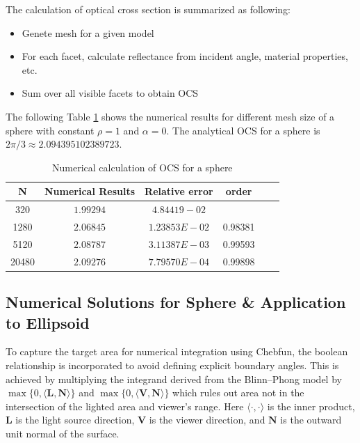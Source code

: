 \documentclass[11pt]{amsart}
\theoremstyle{definition}
\begin{document}
The calculation of optical cross section is summarized as following:
\begin{itemize}
\item Genete mesh for a given model
\item For each facet, calculate reflectance from incident angle, material properties, etc.
\item Sum over all visible facets to obtain OCS
\end{itemize} 
The following Table \ref{table: sphere OCS} shows the numerical results for different mesh size of a sphere with constant $\rho=1$ and $\alpha=0$. The analytical OCS for a sphere is $2\pi/3\approx 2.094395102389723$.
\begin{table}[H]
	\small
	\caption{Numerical calculation of OCS for a sphere
	}
	\centering
	\begin{tabular}{|c|c|c|c|c|c|}
	\hline
	N & Numerical Results & Relative error & order \\
	\hline
	320 & $1.99294$ & $4.84419-02$ &  \\
    \hline	
	1280 & $2.06845$ & $1.23853E-02$ & 0.98381 \\
    \hline	
	5120 & $2.08787$ & $3.11387E-03$ & 0.99593 \\
	\hline
	20480 & $2.09276$ & $7.79570E-04$ & 0.99898 \\
	\hline
	\end{tabular}
	\label{table: sphere OCS}
\end{table}
  
\subsection{Numerical Solutions for Sphere \& Application to Ellipsoid}

To capture the target area for numerical integration using Chebfun, the boolean relationship is incorporated to avoid defining explicit boundary angles. This is achieved by multiplying the integrand derived from the Blinn--Phong model by $\max\{0, \langle \mathbf{L},\mathbf{N}\rangle\}$ and $\max\{0,\langle \mathbf{V},\mathbf{N}\rangle\}$ which rules out area not in the intersection of the lighted area and viewer's range. Here $\langle\cdot, \cdot\rangle$ is the inner product, $\mathbf{L}$ is the light source direction, $\mathbf{V}$ is the viewer direction, and $\mathbf{N}$ is the outward unit normal of the surface.
\end{document}
